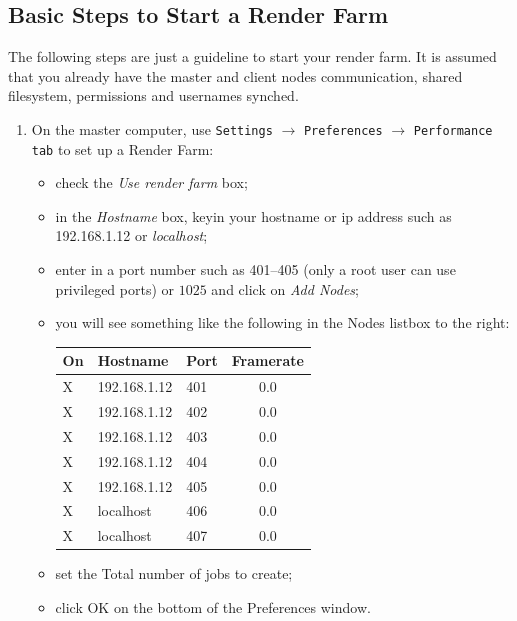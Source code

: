 \subsection{Basic Steps to Start a Render Farm}%
\label{sub:basic_steps_start_render_farm}

The following steps are just a guideline to start your render farm.  It is assumed that you already have the master and client nodes communication, shared filesystem, permissions and usernames synched.

\begin{enumerate}
    \item On the master computer, use \texttt{Settings} $\rightarrow$ \texttt{Preferences} $\rightarrow$ \texttt{Performance} \texttt{tab} to set up a Render Farm:
    \begin{itemize}
        \item check the \textit{Use render farm} box;
        \item in the \textit{Hostname} box, keyin your hostname or ip address such as 192.168.1.12 or \textit{localhost};
        \item enter in a port number such as 401--405 (only a root user can use privileged ports) or $1025$  and click on \textit{Add Nodes};
        \item you will see something like the following in the Nodes listbox to the right:\newline
            \begin{tabular}{lllc}
                On & Hostname     & Port & Framerate \\\midrule
                X  & 192.168.1.12 & 401  & 0.0       \\
                X  & 192.168.1.12 & 402  & 0.0       \\
                X  & 192.168.1.12 & 403  & 0.0       \\
                X  & 192.168.1.12 & 404  & 0.0       \\
                X  & 192.168.1.12 & 405  & 0.0       \\
                X  & localhost    & 406  & 0.0       \\
                X  & localhost    & 407  & 0.0       \\
            \end{tabular}
        \item set the Total number of jobs to create;
        \item click OK on the bottom of the Preferences window.
    \end{itemize}

\end{enumerate}
